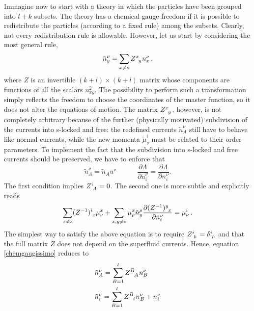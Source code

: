 \documentclass[usenatbib]{mnras}
\newcommand{\spc}{\quad \quad \quad}
\begin{document}
Immagine now to start with a theory in which the particles have been grouped into $l+k$ subsets. The theory has a  chemical gauge freedom if it is possible to redistribute the particles (according to a fixed rule) among the subsets. %
Clearly, not every redistribution rule is allowable. However, let us start by considering the most general rule,
%
\begin{equation}
\label{chemgaugissimo}
\tilde{n}_{y}^\nu = \sum_{x \neq s} Z\indices{^x _{y}} n_x^\nu \, ,
\end{equation} 
%
where $Z$ is an invertible $(k+l)\times (k+l)$ matrix whose components are functions of all the scalars $n_{xy}^2$. The possibility to perform such a transformation simply reflects the freedom to choose the coordinates of the master function, so it does not alter the equations of motion. The matrix $Z\indices{^x _{y}}$, however, is not completely arbitrary because of the further (physically motivated) subdivision of the currents into  s-locked and   free: the redefined currents $\tilde{n}_A^\nu$ still have to behave like normal currents, while the new momenta $\tilde{\mu}_\nu^i$ must be related to their order parameters. 
To implement the fact that the subdivision into s-locked and free currents should be preserved, we have to enforce that
%
\begin{equation}
\tilde{n}_A^\nu 
= 
\tilde{n}_A u^\nu  \spc \dfrac{\partial \Lambda}{\partial \tilde{n}_i^\nu} 
= 
\dfrac{\partial \Lambda}{\partial n_i^\nu}.
\end{equation}
%
The first condition implies $Z\indices{^i _A}=0$. The second one is more subtle and explicitly reads
%
\begin{equation}
\sum_{x \neq s} (Z^{-1})\indices{^i _x} \mu^x_\nu + \sum_{x,y \neq s} \mu^x_\rho \tilde{n}^\rho_y \dfrac{\partial (Z^{-1})\indices{^y_x}}{\partial \tilde{n}_i^\nu} = \mu_\nu^i \, .
\end{equation}
%
The simplest way to satisfy the above equation is to require  $Z\indices{^i _h}= \delta\indices{^i _h}$ and that the full matrix $Z$ does not depend on the superfluid currents. Hence, equation \eqref{chemgaugissimo} reduces to
%
\begin{equation}
\begin{split}
& \tilde{n}_A^\nu = \sum_{B=1}^l Z\indices{^B _A} n_B^\nu \\
& \tilde{n}_i^\nu = \sum_{B=1}^l Z\indices{^B _i} n_B^\nu + n_i^\nu \\
\end{split}
\label{wert}
\end{equation}
\end{document}
